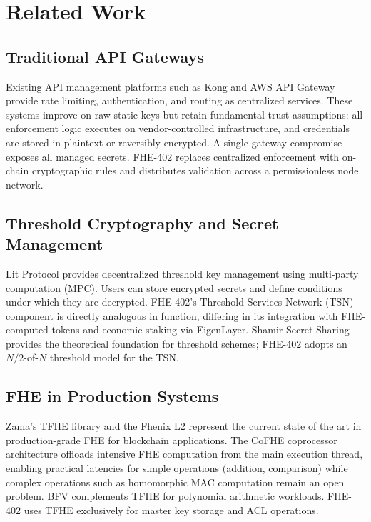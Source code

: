 \documentclass[conference]{IEEEtran}
\begin{document}
\section{Related Work}
\label{sec:related}

\subsection{Traditional API Gateways}
Existing API management platforms such as Kong \cite{kong} and AWS API Gateway \cite{aws_apigw}
provide rate limiting, authentication, and routing as centralized services. These systems
improve on raw static keys but retain fundamental trust assumptions: all enforcement logic
executes on vendor-controlled infrastructure, and credentials are stored in plaintext or
reversibly encrypted. A single gateway compromise exposes all managed secrets. FHE-402
replaces centralized enforcement with on-chain cryptographic rules and distributes validation
across a permissionless node network.

\subsection{Threshold Cryptography and Secret Management}
Lit Protocol \cite{lit_protocol} provides decentralized threshold key management using
multi-party computation (MPC). Users can store encrypted secrets and define conditions
under which they are decrypted. FHE-402's Threshold Services Network (TSN) component
is directly analogous in function, differing in its integration with FHE-computed tokens
and economic staking via EigenLayer. Shamir Secret Sharing \cite{shamir} provides the
theoretical foundation for threshold schemes; FHE-402 adopts an $N/2$-of-$N$ threshold
model for the TSN.

\subsection{FHE in Production Systems}
Zama's TFHE library \cite{zama_tfhe} and the Fhenix L2 \cite{fhenix} represent the
current state of the art in production-grade FHE for blockchain applications. The CoFHE
coprocessor architecture \cite{cofhe} offloads intensive FHE computation from the main
execution thread, enabling practical latencies for simple operations (addition, comparison)
while complex operations such as homomorphic MAC computation remain an open problem.
BFV \cite{bfv} complements TFHE for polynomial arithmetic workloads. FHE-402 uses TFHE
exclusively for master key storage and ACL operations.
\end{document}
